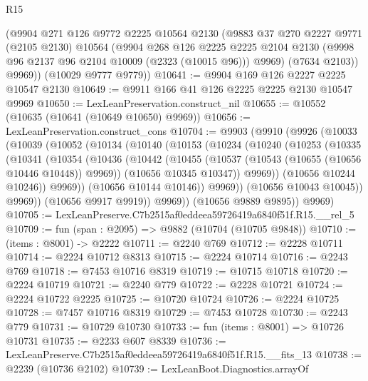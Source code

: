 \begin{lexlean}{R15}
\begin{coremodule}
        (@9904
          @271
          @126
          @9772
          @2225
          @10564
          @2130
          (@9883
            @37
            @270
            @2227
            @9771
            (@2105 @2130)
            @10564
            (@9904
              @268
              @126
              @2225
              @2225
              @2104
              @2130
              (@9998 @96 @2137 @96 @2104 @10009 (@2323 (@10015 @96)))
              @9969)
            (@7634 @2103))
          @9969))
      (@10029 @9777 @9779))
@10641 := @9904 @169 @126 @2227 @2225 @10547 @2130
@10649 := @9911 @166 @41 @126 @2225 @2225 @2130 @10547 @9969
@10650 := LexLeanPreservation.construct_nil
@10655 := @10552 (@10635 (@10641 (@10649 @10650) @9969))
@10656 := LexLeanPreservation.construct_cons
@10704 := @9903
    (@9910
      (@9926
        (@10033
          (@10039
            (@10052
              (@10134
                (@10140
                  (@10153
                    (@10234
                      (@10240
                        (@10253
                          (@10335
                            (@10341
                              (@10354
                                (@10436
                                  (@10442
                                    (@10455
                                      (@10537 (@10543 (@10655 (@10656 @10446 @10448)) @9969))
                                      (@10656 @10345 @10347))
                                    @9969))
                                (@10656 @10244 @10246))
                              @9969))
                          (@10656 @10144 @10146))
                        @9969))
                    (@10656 @10043 @10045))
                  @9969))
              (@10656 @9917 @9919))
            @9969))
        (@10656 @9889 @9895))
      @9969)
@10705 := LexLeanPreserve.C7b2515af0eddeea59726419a6840f51f.R15.__rel_5
@10709 := fun (span : @2095) => @9882 (@10704 (@10705 @9848))
@10710 := (items : @8001) -> @2222
@10711 := @2240 @769
@10712 := @2228 @10711
@10714 := @2224 @10712 @8313
@10715 := @2224 @10714
@10716 := @2243 @769
@10718 := @7453 @10716 @8319
@10719 := @10715 @10718
@10720 := @2224 @10719
@10721 := @2240 @779
@10722 := @2228 @10721
@10724 := @2224 @10722 @2225
@10725 := @10720 @10724
@10726 := @2224 @10725
@10728 := @7457 @10716 @8319
@10729 := @7453 @10728
@10730 := @2243 @779
@10731 := @10729 @10730
@10733 := fun (items : @8001) => @10726 @10731
@10735 := @2233 @607 @8339
@10736 := LexLeanPreserve.C7b2515af0eddeea59726419a6840f51f.R15.__fits_13
@10738 := @2239 (@10736 @2102)
@10739 := LexLeanBoot.Diagnostics.arrayOf

\end{coremodule}
\end{lexlean}
